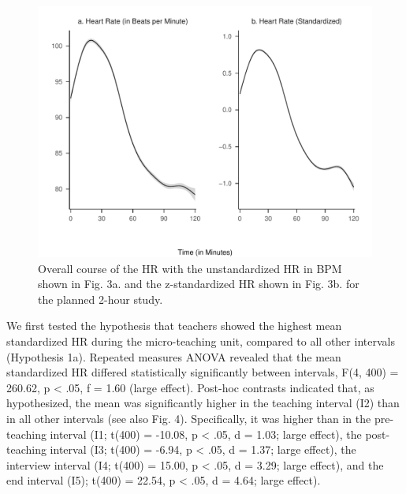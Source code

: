 \documentclass[preprint, 3p,
authoryear]{elsarticle} %
\begin{document}
\begin{figure}[H]
  \centering
  \includegraphics[width=1\textwidth]{plots_publication/loess_plot_std_unstd_new.pdf}
  \caption{Overall course of the HR with the unstandardized HR in BPM shown in Fig. 3a. and the z-standardized HR shown in Fig. 3b. for the planned 2-hour study.}
  \label{Overall course of the HR with the unstandardized HR in BPM shown in Fig. 3a. and the z-standardized HR shown in Fig. 3b. for the planned 2-hour study.}
\end{figure}

We first tested the hypothesis that teachers showed the highest mean
standardized HR during the micro-teaching unit, compared to all other
intervals (Hypothesis 1a). Repeated measures ANOVA revealed that the
mean standardized HR differed statistically significantly between
intervals, F(4, 400) = 260.62, p \textless{} .05, f = 1.60 (large
effect). Post-hoc contrasts indicated that, as hypothesized, the mean
was significantly higher in the teaching interval (I2) than in all other
intervals (see also Fig. 4). Specifically, it was higher than in the
pre-teaching interval (I1; t(400) = -10.08, p \textless{} .05, d = 1.03;
large effect), the post-teaching interval (I3; t(400) = -6.94, p
\textless{} .05, d = 1.37; large effect), the interview interval (I4;
t(400) = 15.00, p \textless{} .05, d = 3.29; large effect), and the end
interval (I5); t(400) = 22.54, p \textless{} .05, d = 4.64; large
effect).
\end{document}
